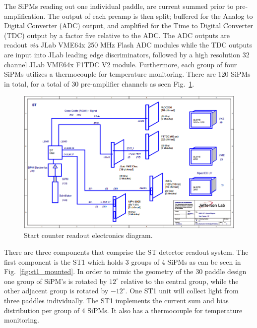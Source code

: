 The SiPMs reading out one individual paddle, are current summed prior to pre-amplification.  The output of each preamp is then split; buffered for the Analog to Digital Converter (ADC) output, and amplified for the Time to Digital Converter (TDC) output by a factor five relative to the ADC.  The ADC outputs are readout \emph{via} JLab VME64x 250 MHz Flash ADC modules while the TDC outputs are input into JLab leading edge discriminators, followed by a high resolution 32 channel JLab VME64x F1TDC V2 module.  Furthermore, each group of four SiPMs utilizes a thermocouple for temperature monitoring. There are 120 SiPMs in total, for a total of 30 pre-amplifier channels as seen Fig.~\ref{fig:Start Counter Electronics}.
	\begin{figure}[!htb]
		\centering
		\includegraphics[width=1.0\columnwidth]{design/figs/ST_Electronics_v2}
		\caption{Start counter readout electronics diagram.}
		\label{fig:Start Counter Electronics}
	\end{figure}

There are three components that comprise the ST detector readout system.  The first component is the ST1 which holds 3 groups of 4 SiPMs as can be seen in Fig.~\ref{fig:st1_mounted}.  In order to mimic the geometry of the 30 paddle design one group of SiPM's is rotated by $12^{\circ}$ relative to the central group, while the other adjacent group is rotated by $-12^{\circ}$.  One ST1 unit will collect light from three paddles individually.  The ST1 implements the current sum and bias distribution per group of 4 SiPMs.  It also has a thermocouple for temperature monitoring.  

